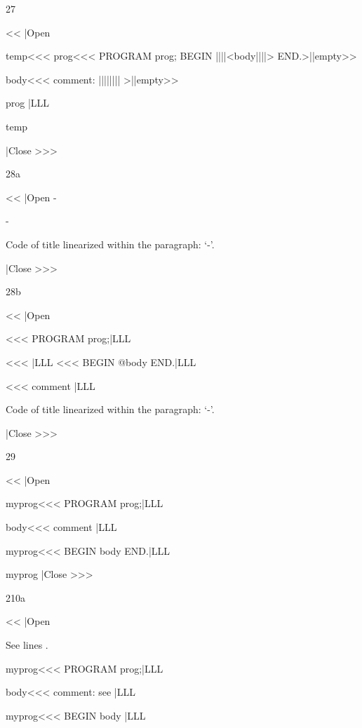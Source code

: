 {2{7}

\<<<
|Open

\<temp\><<<
\<prog\><<<
PROGRAM prog;
BEGIN
  ||||<body||||>
END.>||empty>>  

\<body\><<<
{comment: \@||||||||} >||empty>>

\OutputCode\<prog\>  |LLL  

\OutputCode[prg]\<temp\>     
  
|Close >>> 


2{8a}

\<<<
|Open
\Code{}
\ShowCode-\myprog

\AppendCode{}
\Code{}  
\ShowCode-\myprog

\AppendCode{}  
\ShowCode\body

Code of title \myprog{} 
linearized within
the paragraph: 
`\ShowCode-\myprog'.

\OutputCode\myprog 
|Close >>>

2{8b}


\<<<
|Open

\Code{}<<<
PROGRAM prog;|LLL

\Code{}<<<
|LLL
\AppendCode\myprog<<<
BEGIN         
  @body 
END.|LLL

\AppendCode\body<<<
 {comment} |LLL

Code of title \myprog{} 
linearized within the 
paragraph: 
`\ShowCode-\myprog'.

\OutputCode\myprog
|Close >>>


2{9}

\<<<
|Open

\<myprog\><<<
PROGRAM prog;|LLL

\<body\><<<
{ comment } |LLL

\<myprog\><<<
BEGIN
  \<body\>
END.|LLL

\OutputCode\<myprog\>
|Close >>>

2{10a}

\<<<
|Open

See lines \RefLine[*].

\<myprog\><<<
PROGRAM prog;\TagLine[*] |LLL

\<body\><<<
{comment: see \RefLine[*]}|LLL

\<myprog\><<<
BEGIN         
  \<body\>   \TagLine[*] |LLL

}
